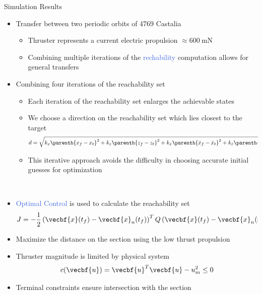 \documentclass[final, usenames, dvipsnames]{beamer}
\newlength{\twocolwidth}
\def\Emph{\textcolor{RoyalBlue}}
\begin{document}
\begin{frame}[t]
\begin{columns}[T]
\begin{column}{\twocolwidth}
\begin{block}{Simulation Results} %
    \begin{minipage}[t]{0.5\columnwidth}
    \begin{itemize}
        \item Transfer between two periodic orbits of 4769 Castalia
        \begin{itemize}
            \item Thruster represents a current electric propulsion \( \approx \SI{600}{\milli\newton}\)
            \item Combining multiple iterations of the \Emph{rechability} computation allows for general transfers
        \end{itemize}
        \item Combining four iterations of the reachability set
        \begin{itemize}
            \item Each iteration of the reachability set enlarges the achievable states
            \item We choose a direction on the reachability set which lies closest to the target
            \[
                d = \sqrt{k_x \parenth{x_f - x_t }^2 + k_z \parenth{z_f - z_t }^2 + k_{\dot{x}}\parenth{\dot{x}_f - \dot{x}_t }^2 + k_{\dot{z}}\parenth{\dot{z}_f - \dot{z}_t }^2}
            \]
            \item This iterative approach avoids the difficulty in choosing accurate initial guesses for optimization
        \end{itemize}
    \end{itemize}
    \end{minipage}~
    \begin{minipage}[t]{0.5\columnwidth}
    \begin{itemize}
        \item \Emph{Optimal Control} is used to calculate the reachability set
            \[
            J = -\frac{1}{2} \left( \vecbf{x}(t_f) - \vecbf{x}_{n}(t_f)\right)^T Q \left( \vecbf{x}(t_f) - \vecbf{x}_{n}(t_f)\right) 
            \]
        \item Maximize the distance on the section using the low thrust propulsion
        \item Thruster magnitude is limited by physical system
        \[
            c(\vecbf{u}) = \vecbf{u}^T \vecbf{u} - u_m^2 \leq 0 
        \]
        \item Terminal constraints ensure intersection with the section
    \end{itemize}

\end{minipage}
\end{block}
\end{column}
\end{columns}
\end{frame}
\end{document}
